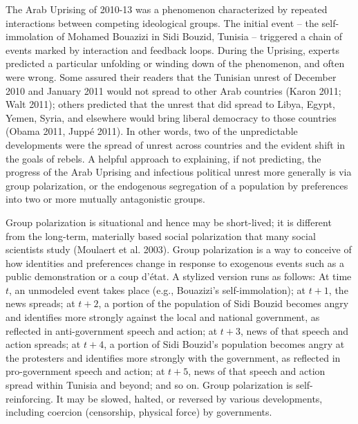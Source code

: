 \documentclass[12pt]{article}
\begin{document}
	The Arab Uprising of 2010-13 was a phenomenon characterized by repeated interactions between competing ideological groups.  The initial event – the self-immolation of Mohamed Bouazizi in Sidi Bouzid, Tunisia – triggered a chain of events marked by interaction and feedback loops.  During the Uprising, experts predicted a particular unfolding or winding down of the phenomenon, and often were wrong.  Some assured their readers that the Tunisian unrest of December 2010 and January 2011 would not spread to other Arab countries (Karon 2011; Walt 2011); others predicted that the unrest that did spread to Libya, Egypt, Yemen, Syria, and elsewhere would bring liberal democracy to those countries (Obama 2011, Jupp\'{e} 2011).  In other words, two of the unpredictable developments were the spread of unrest across countries and the evident shift in the goals of rebels.  
A helpful approach to explaining, if not predicting, the progress of the Arab Uprising and infectious political unrest more generally is via group polarization, or the endogenous segregation of a population by preferences into two or more mutually antagonistic groups.  

Group polarization is situational and hence may be short-lived; it is different from the long-term, materially based social polarization that many social scientists study (Moulaert et al. 2003).  Group polarization is a way to conceive of how identities and preferences change in response to exogenous events such as a public demonstration or a coup d'\'{e}tat.  A stylized version runs as follows:  At time $t$, an unmodeled event takes place (e.g., Bouazizi's self-immolation); at $t+1$, the news spreads; at $t+2$, a portion of the population of Sidi Bouzid becomes angry and identifies more strongly against the local and national government, as reflected in anti-government speech and action; at $t+3$, news of that speech and action spreads; at $t+4$, a portion of Sidi Bouzid's population becomes angry at the protesters and identifies more strongly with the government, as reflected in pro-government speech and action; at $t+5$, news of that speech and action spread within Tunisia and beyond; and so on.  Group polarization is self-reinforcing.  It may be slowed, halted, or reversed by various developments, including coercion (censorship, physical force) by governments.
\end{document}
